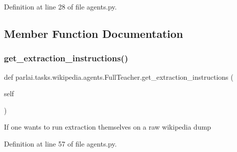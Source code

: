 Definition at line 28 of file agents.\+py.



\subsection{Member Function Documentation}
\mbox{\label{classparlai_1_1tasks_1_1wikipedia_1_1agents_1_1FullTeacher_a37c660b0fdaba618690bfde0eb425ccf}} 
\subsubsection{\texorpdfstring{get\+\_\+extraction\+\_\+instructions()}{get\_extraction\_instructions()}}
{\footnotesize\ttfamily def parlai.\+tasks.\+wikipedia.\+agents.\+Full\+Teacher.\+get\+\_\+extraction\+\_\+instructions (\begin{DoxyParamCaption}\item[{}]{self }\end{DoxyParamCaption})}

\begin{DoxyVerb}If one wants to run extraction themselves on a raw wikipedia dump\end{DoxyVerb}
 

Definition at line 57 of file agents.\+py.



